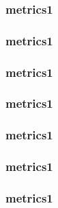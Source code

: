 \documentclass{beamer}
\begin{document}
\begin{frame}
\frametitle{metrics1}
\end{frame}
\begin{frame}
\frametitle{metrics1}
\end{frame}
\begin{frame}
\frametitle{metrics1}
\end{frame}
\begin{frame}
\frametitle{metrics1}
\end{frame}
\begin{frame}
\frametitle{metrics1}
\end{frame}
\begin{frame}
\frametitle{metrics1}
\end{frame}
\begin{frame}
\frametitle{metrics1}
\end{frame}
\end{document}

